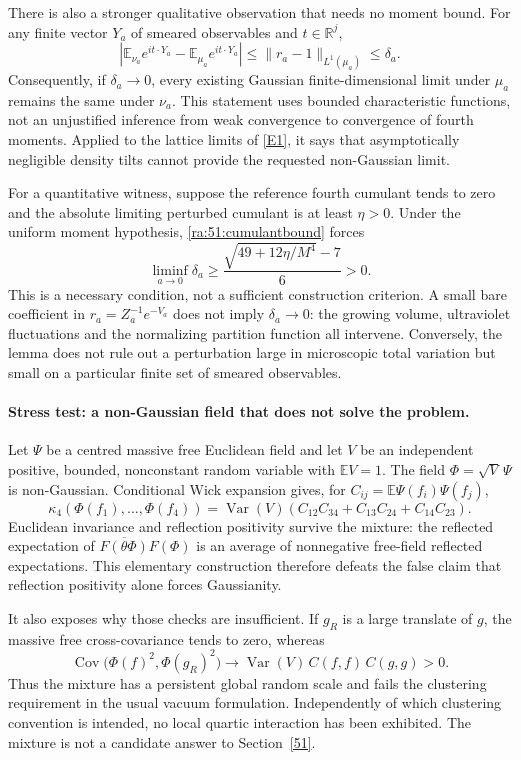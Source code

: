 \documentclass[11pt]{article}
\newcommand{\R}{\mathbb{R}}
\newcommand{\E}{\mathbb{E}}
\newcommand{\eref}[2]{\hyperlink{extra:#1:#2}{[E#2]}}
\begin{document}
There is also a stronger qualitative observation that needs no moment
bound. For any finite vector $Y_a$ of smeared observables and $t\in\R^j$,
\begin{equation}\label{ra:51:characteristic}
 \left|\E_{\nu_a}e^{i t\cdot Y_a}-\E_{\mu_a}e^{i t\cdot Y_a}\right|
 \le\|r_a-1\|_{L^1(\mu_a)}\le\delta_a.
\end{equation}
Consequently, if $\delta_a\to0$, every existing Gaussian finite-dimensional
limit under $\mu_a$ remains the same under $\nu_a$. This statement uses
bounded characteristic functions, not an unjustified inference from weak
convergence to convergence of fourth moments. Applied to the lattice
limits of \eref{51}{1}, it says that asymptotically negligible density
tilts cannot provide the requested non-Gaussian limit.

For a quantitative witness, suppose the reference fourth cumulant tends
to zero and the absolute limiting perturbed cumulant is at least $\eta>0$.
Under the uniform moment hypothesis, \eqref{ra:51:cumulantbound} forces
\[
 \liminf_{a\to0}\delta_a
 \ge \frac{\sqrt{49+12\eta/M^4}-7}{6}>0.
\]
This is a necessary condition, not a sufficient construction criterion.
A small bare coefficient in $r_a=Z_a^{-1}e^{-V_a}$ does not imply
$\delta_a\to0$: the growing volume, ultraviolet fluctuations and the
normalizing partition function all intervene. Conversely, the lemma does
not rule out a perturbation large in microscopic total variation but small
on a particular finite set of smeared observables.

\paragraph{Stress test: a non-Gaussian field that does not solve the problem.}
Let $\Psi$ be a centred massive free Euclidean field and let $V$ be an
independent positive, bounded, nonconstant random variable with $\E V=1$.
The field $\Phi=\sqrt V\,\Psi$ is non-Gaussian. Conditional Wick expansion
gives, for $C_{ij}=\E\Psi(f_i)\Psi(f_j)$,
\[
 \kappa_4(\Phi(f_1),\ldots,\Phi(f_4))
 =\operatorname{Var}(V)
   (C_{12}C_{34}+C_{13}C_{24}+C_{14}C_{23}).
\]
Euclidean invariance and reflection positivity survive the mixture:
the reflected expectation of $\overline{F(\theta\Phi)}F(\Phi)$ is an
average of nonnegative free-field reflected expectations. This elementary
construction therefore defeats the false claim that reflection positivity
alone forces Gaussianity.

It also exposes why those checks are insufficient. If $g_R$ is a large
translate of $g$, the massive free cross-covariance tends to zero, whereas
\[
 \operatorname{Cov}\bigl(\Phi(f)^2,\Phi(g_R)^2\bigr)
 \longrightarrow
 \operatorname{Var}(V)\,C(f,f)\,C(g,g)>0.
\]
Thus the mixture has a persistent global random scale and fails the
clustering requirement in the usual vacuum formulation. Independently of
which clustering convention is intended, no local quartic interaction has
been exhibited. The mixture is not a candidate answer to Section~\ref{51}.
\end{document}
